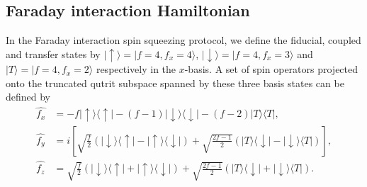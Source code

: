 \documentclass[preprint,aps,pra,onecolumn,superscriptaddress]{revtex4-1} %
\def\bra#1{\langle{#1}\rvert}%
\def\ket#1{\lvert{#1}\rangle}%
\begin{document}
\begin{appendix}

\section{Faraday interaction Hamiltonian} \label{Appendix::FaradayInteractionHamiltonian}
In the Faraday interaction spin squeezing protocol, we define the fiducial, coupled and transfer states by $ \ket{\uparrow}=\ket{f=4,f_x=4} $, $ \ket{\downarrow}=\ket{f=4,f_x=3} $ and $ \ket{T}=\ket{f=4,f_x=2} $ respectively in the $ x $-basis. 
A set of spin operators projected onto the truncated qutrit subspace spanned by these three basis states can be defined by
\begin{align}
\hat{f_x} &= -f \ket{\uparrow}\bra{\uparrow} -(f-1)\ket{\downarrow}\bra{\downarrow}-(f-2)\ket{T}\bra{T},\\
\hat{f_y} &=i\left[\sqrt{\frac{f}{2}}\left(\ket{\downarrow}\bra{\uparrow}-\ket{\uparrow}\bra{\downarrow}\right) +\sqrt{\frac{2f-1}{2}}\left(\ket{T}\bra{\downarrow}-\ket{\downarrow}\bra{T} \right) \right] ,\\
\hat{f_z} &= \sqrt{\frac{f}{2}}\left(\ket{\downarrow}\bra{\uparrow}+\ket{\uparrow}\bra{\downarrow}\right) +\sqrt{\frac{2f-1}{2}}\left(\ket{T}\bra{\downarrow}+\ket{\downarrow}\bra{T} \right).
\end{align}


\end{appendix}
\end{document}
